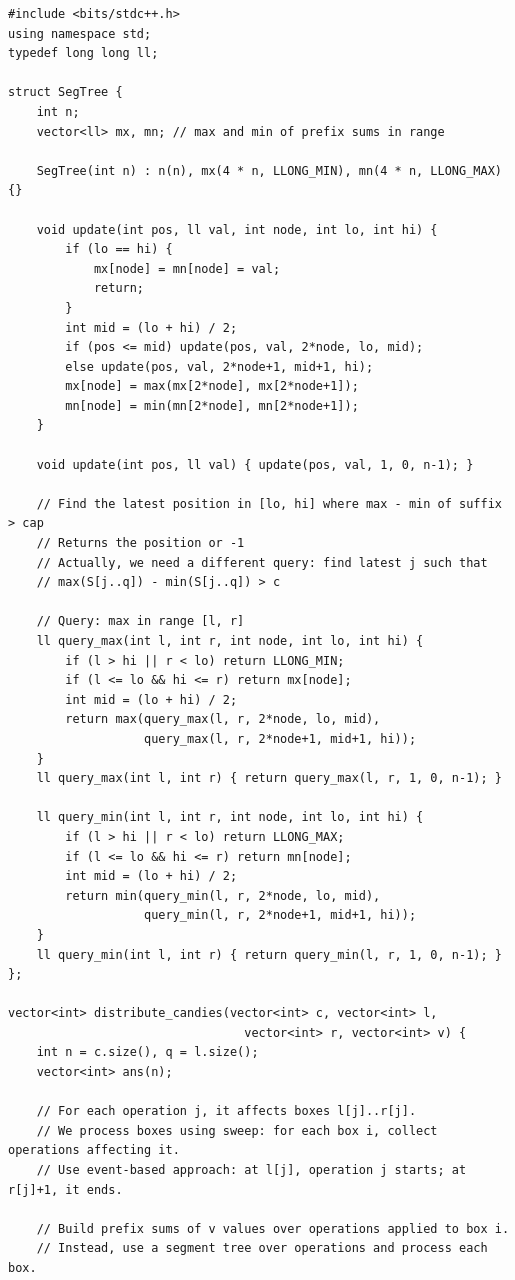 \documentclass[11pt,a4paper]{article}
\begin{document}
\begin{lstlisting}
#include <bits/stdc++.h>
using namespace std;
typedef long long ll;

struct SegTree {
    int n;
    vector<ll> mx, mn; // max and min of prefix sums in range

    SegTree(int n) : n(n), mx(4 * n, LLONG_MIN), mn(4 * n, LLONG_MAX) {}

    void update(int pos, ll val, int node, int lo, int hi) {
        if (lo == hi) {
            mx[node] = mn[node] = val;
            return;
        }
        int mid = (lo + hi) / 2;
        if (pos <= mid) update(pos, val, 2*node, lo, mid);
        else update(pos, val, 2*node+1, mid+1, hi);
        mx[node] = max(mx[2*node], mx[2*node+1]);
        mn[node] = min(mn[2*node], mn[2*node+1]);
    }

    void update(int pos, ll val) { update(pos, val, 1, 0, n-1); }

    // Find the latest position in [lo, hi] where max - min of suffix > cap
    // Returns the position or -1
    // Actually, we need a different query: find latest j such that
    // max(S[j..q]) - min(S[j..q]) > c

    // Query: max in range [l, r]
    ll query_max(int l, int r, int node, int lo, int hi) {
        if (l > hi || r < lo) return LLONG_MIN;
        if (l <= lo && hi <= r) return mx[node];
        int mid = (lo + hi) / 2;
        return max(query_max(l, r, 2*node, lo, mid),
                   query_max(l, r, 2*node+1, mid+1, hi));
    }
    ll query_max(int l, int r) { return query_max(l, r, 1, 0, n-1); }

    ll query_min(int l, int r, int node, int lo, int hi) {
        if (l > hi || r < lo) return LLONG_MAX;
        if (l <= lo && hi <= r) return mn[node];
        int mid = (lo + hi) / 2;
        return min(query_min(l, r, 2*node, lo, mid),
                   query_min(l, r, 2*node+1, mid+1, hi));
    }
    ll query_min(int l, int r) { return query_min(l, r, 1, 0, n-1); }
};

vector<int> distribute_candies(vector<int> c, vector<int> l,
                                 vector<int> r, vector<int> v) {
    int n = c.size(), q = l.size();
    vector<int> ans(n);

    // For each operation j, it affects boxes l[j]..r[j].
    // We process boxes using sweep: for each box i, collect operations affecting it.
    // Use event-based approach: at l[j], operation j starts; at r[j]+1, it ends.

    // Build prefix sums of v values over operations applied to box i.
    // Instead, use a segment tree over operations and process each box.


\end{lstlisting}
\end{document}
